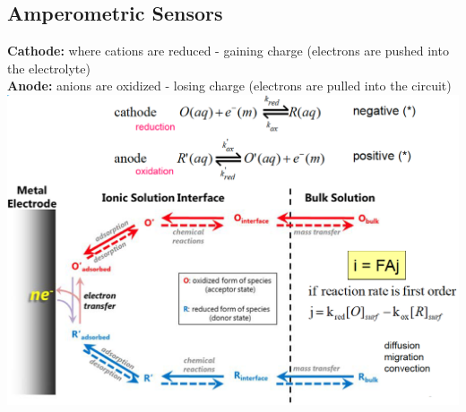 \documentclass[9pt]{article}
\begin{document}
\begin{multicols}{2}
\section{Amperometric Sensors}
    \textbf{Cathode: }where cations are reduced - gaining charge (electrons are pushed into the electrolyte)\\
    \textbf{Anode: }anions are oxidized - losing charge (electrons are pulled into the circuit)\\
    \includegraphics[scale=0.2]{Images/redox_current.png}

\end{multicols}
\end{document}

